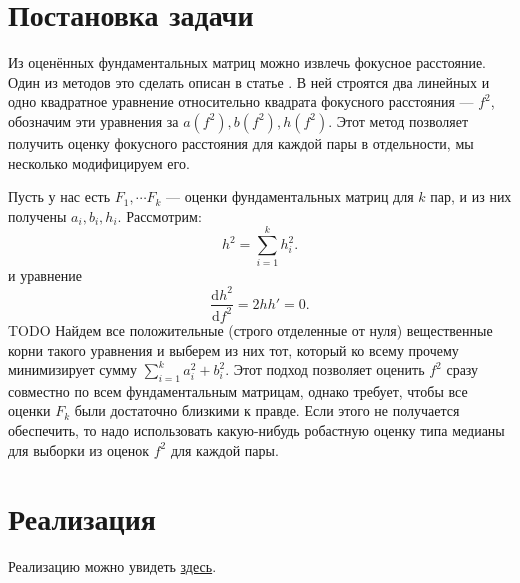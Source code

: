 \label{focal}
\section{Постановка задачи}
Из оценённых фундаментальных матриц можно извлечь фокусное расстояние. Один из методов это сделать описан в статье \cite{Sturm:2005:FLC:1090456.1649082}. В ней строятся два линейных и одно квадратное уравнение относительно квадрата фокусного расстояния --- $f^2$, обозначим эти уравнения за $a\left(f^2\right), b\left(f^2\right), h\left(f^2\right)$. Этот метод позволяет получить  оценку фокусного расстояния для каждой пары в отдельности, мы несколько модифицируем его. 

Пусть у нас есть $F_1, \cdots F_k$ --- оценки фундаментальных матриц для $k$ пар, и из них получены $a_i, b_i, h_i$. 
Рассмотрим:
\begin{equation}
	h^2 = \sum\limits_{i=1}^{k} h^2_i.
\end{equation} 
и уравнение
\begin{equation}
	\frac{\mathrm{d} h^2}{\mathrm{d}f^2} = 2hh' = 0.
\end{equation} 
TODO Найдем все положительные (строго отделенные от нуля) вещественные корни такого уравнения и выберем из них тот, который ко всему прочему минимизирует сумму $\sum\limits_{i=1}^{k} a_i^2 + b_i^2$. Этот подход позволяет оценить $f^2$ сразу совместно по всем фундаментальным матрицам, однако требует, чтобы все оценки $F_k$ были достаточно близкими к правде. Если этого не получается обеспечить, то надо использовать какую-нибудь робастную оценку типа медианы для выборки из оценок $f^2$ для каждой пары.
\section{Реализация}
Реализацию можно увидеть \href{https://github.com/QuantumMechanicus/camera_calibration_test/blob/dev/subroutines/focal_length_estimator/Focal_Estimator.cpp}{здесь}.

